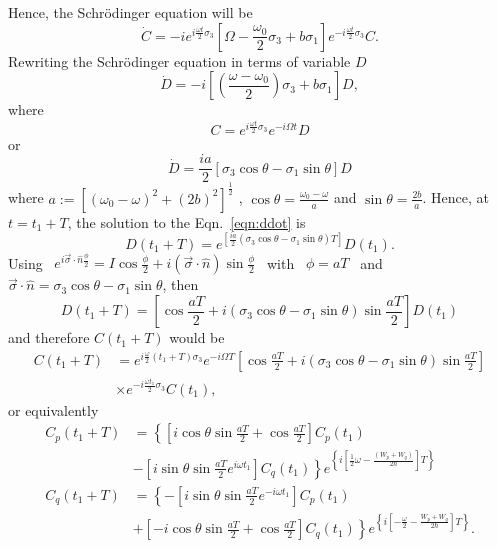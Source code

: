 Hence, the Schr\"{o}dinger equation will be
\begin{equation}
\dot{C}= -i e^{ i \frac{\omega t}{2}\sigma_3} \left[\Omega - \frac{\omega_0}{2} \sigma_3+b \sigma_1\right] e^{-i\frac{\omega t}{2}\sigma_3} C.
\end{equation}
Rewriting the Schr\"{o}dinger equation in terms of variable $D$
\begin{equation}
\dot{D}=-i \left[ \left( \frac{\omega - \omega_0}{2}\right) \sigma_3 +b \sigma_1 \right]D ,
\end{equation}
where 
\begin{equation}
C= e^{i \frac{\omega t}{2}\sigma_3} e^{-i \Omega t} D
\end{equation}
or
\begin{equation}
  \label{eqn:ddot}
\dot{D}=\frac{i a}{2}\left[ \sigma_3 \cos \theta - \sigma_1 \sin \theta \right] D
\end{equation}
where
$ a:= {\left[{(\omega_0 - \omega)}^2+ {(2b)}^2\right]}^\frac{1}{2}$ ,
$\cos \theta = \frac{\omega_0 - \omega}{a}$ and
$\sin \theta=\frac{2b}{a}$. Hence, at $t = t_1+T$, the solution to
the Eqn.~\ref{eqn:ddot} is
\begin{equation}
D(t_1+T)= e^{\left[\frac{i a}{2}
\left( \sigma_3 \cos \theta
-\sigma_1\sin \theta 
\right) T 
\right]
}D(t_1).
\end{equation}
Using
~$ e^{i \vec{\sigma}\cdot\hat{n}\frac{\phi}{2}}= I \cos \frac{\phi}{2}+
i (\vec{\sigma}\cdot\hat{n})\sin \frac{\phi}{2}$ ~with~ $ \phi=aT$ ~and
~$\vec{\sigma}\cdot\hat{n}=\sigma_3 \cos \theta -\sigma_1 \sin \theta$,
then
\begin{equation}
D(t_1+T)= \left[\cos \frac{aT}{2}+i(\sigma_3 \cos \theta - \sigma_1 \sin \theta ) \sin \frac{aT}{2}\right] D(t_1)
\end{equation}
and therefore $C(t_1+T)$ would be
\begin{align}
  C(t_1+T) &= e^{i\frac{\omega}{2}(t_1+T)\sigma_3} e^{-i \Omega T} \left[\cos \frac{aT}{2}+i(\sigma_3 \cos \theta - \sigma_1 \sin \theta ) \sin \frac{aT}{2}\right]\\ \nonumber
  & \times e^{-i \frac{\omega t_1}{2}\sigma_3} C(t_1),
\end{align}
or equivalently
\begin{align}
  C_p(t_1+T)&= \left\lbrace \left[
              i \cos \theta \sin \frac{aT}{2}+\cos \frac{aT}{2} \right] C_p(t_1)\right. \\ \nonumber
  &-
 \left . \left[i \sin \theta \sin \frac{aT}{2} e^{i \omega t_1} \right]C_q(t_1) \right\rbrace 
  e^{\left\lbrace i\left[\frac{1}{2}\omega - \frac{(W_p + W_q)}{2\hbar}\right] T\right\rbrace}
\\ \nonumber
  C_q(t_1+T)&=\left\lbrace - \left[ i \sin \theta \sin \frac{aT}{2} e^{-i \omega t_1}\right]C_p(t_1) \right . \\ \nonumber
  &+
\left .  \left[-i \cos \theta \sin \frac{aT}{2}+ \cos \frac{aT}{2}\right] C_q(t_1)\right\rbrace
  e^{\left\lbrace i \left[ -\frac{\omega}{2}- \frac{W_p+W_q}{2\hbar} \right] T \right\rbrace} .
\end{align}

